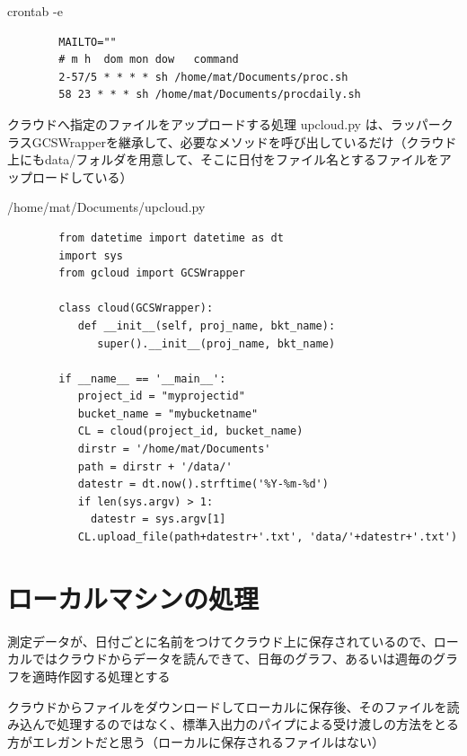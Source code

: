\documentclass[12pt,a4j]{jsbook}
\begin{document}
\begin{spacing}{0.95}
\begin{itembox}[l]{crontab -e}
\begin{verbatim}
		MAILTO=""
		# m h  dom mon dow   command
		2-57/5 * * * * sh /home/mat/Documents/proc.sh
		58 23 * * * sh /home/mat/Documents/procdaily.sh
\end{verbatim}
\end{itembox}
\end{spacing}

クラウドへ指定のファイルをアップロードする処理 upcloud.py は、ラッパークラスGCSWrapperを継承して、必要なメソッドを呼び出しているだけ（クラウド上にもdata/フォルダを用意して、そこに日付をファイル名とするファイルをアップロードしている）

\begin{spacing}{0.95}
\begin{itembox}[l]{/home/mat/Documents/upcloud.py}
\begin{verbatim}
		from datetime import datetime as dt
		import sys
		from gcloud import GCSWrapper

		class cloud(GCSWrapper):
		   def __init__(self, proj_name, bkt_name):
		      super().__init__(proj_name, bkt_name)

		if __name__ == '__main__':
		   project_id = "myprojectid"
		   bucket_name = "mybucketname"
		   CL = cloud(project_id, bucket_name)
		   dirstr = '/home/mat/Documents'
		   path = dirstr + '/data/'
		   datestr = dt.now().strftime('%Y-%m-%d')
		   if len(sys.argv) > 1:
		     datestr = sys.argv[1]
		   CL.upload_file(path+datestr+'.txt', 'data/'+datestr+'.txt')
\end{verbatim}
\end{itembox}
\end{spacing}


\section{ローカルマシンの処理}

測定データが、日付ごとに名前をつけてクラウド上に保存されているので、ローカルではクラウドからデータを読んできて、日毎のグラフ、あるいは週毎のグラフを適時作図する処理とする

クラウドからファイルをダウンロードしてローカルに保存後、そのファイルを読み込んで処理するのではなく、標準入出力のパイプによる受け渡しの方法をとる方がエレガントだと思う（ローカルに保存されるファイルはない）
\end{document}
